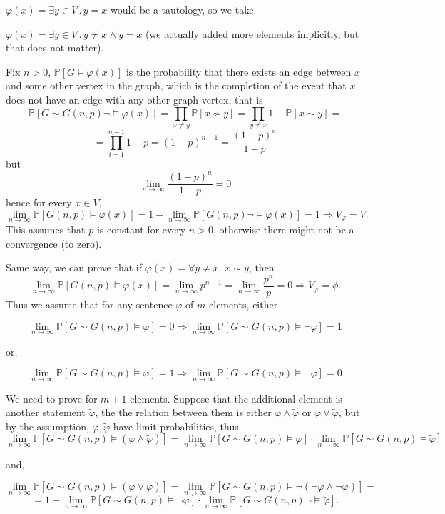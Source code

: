 \documentclass{article}
\begin{document}
$\varphi(x)=\exists{y\in{V}}\,.\,y={x}$ would be a tautology, so we take 

$\varphi(x)=\exists{y\in{V}}\,.\,y\neq{x}\land{y={x}}$ (we actually added more elements implicitly, but that does not matter).

Fix $n>0$, $\mathbb{P}[G\vDash\varphi(x)]$ is the probability that there exists an edge between $x$ and some other vertex in the graph, which is the completion of the event that $x$ does not have an edge with any other graph vertex, that is \[\mathbb{P}[G\sim{G(n,p)}\neg\vDash\varphi(x)]=\prod_{x\neq{y}}\mathbb{P}[x\nsim{y}]=\prod_{y\neq{x}}1-\mathbb{P}[x\sim{y}]=\]\[=\prod_{i=1}^{n-1}1-p=(1-p)^{n-1}=\frac{(1-p)^n}{1-p}\]
but \[\lim_{n\rightarrow\infty}\frac{(1-p)^n}{1-p}=0\]
hence for every $x\in{V}$, \[\lim_{n\rightarrow\infty}\mathbb{P}[G(n,p)\vDash\varphi(x)]=1-\lim_{n\rightarrow\infty}\mathbb{P}[G(n,p)\neg\vDash\varphi(x)]=1\Rightarrow{V_\varphi={V}}.\]
This assumes that $p$ is constant for every $n>0$, otherwise there might not be a convergence (to zero).

Same way, we can prove that if $\varphi(x)=\forall{y\neq{x}}\,.\,x\sim{y}$, then \[\lim_{n\rightarrow\infty}\mathbb{P}[G(n,p)\vDash\varphi(x)]=\lim_{n\rightarrow\infty}p^{n-1}=\lim_{n\rightarrow\infty}\frac{p^n}{p}=0\Rightarrow{V_\varphi=\phi}.\]
Thus we assume that for any sentence $\varphi$ of $m$ elements, either

\[\lim_{n\rightarrow\infty}\mathbb{P}[G\sim{G(n,p)\vDash\varphi}]=0\Rightarrow\lim_{n\rightarrow\infty}\mathbb{P}[G\sim{G(n,p)\vDash\neg\varphi}]=1\]

or,

\[\lim_{n\rightarrow\infty}\mathbb{P}[G\sim{G(n,p)\vDash\varphi}]=1\Rightarrow\lim_{n\rightarrow\infty}\mathbb{P}[G\sim{G(n,p)\vDash\neg\varphi}]=0\]

We need to prove for $m+1$ elements. Suppose that the additional element is another statement $\tilde\varphi$, the the relation between them is either $\varphi\land\tilde\varphi$ or $\varphi\lor\tilde\varphi$, but by the assumption, $\varphi,\tilde\varphi$ have limit probabilities, thus \[\lim_{n\rightarrow\infty
}\mathbb{P}[G\sim{G(n,p)}\vDash(\varphi\land\tilde\varphi)]=\lim_{n\rightarrow\infty
}\mathbb{P}[G\sim{G(n,p)}\vDash\varphi]\cdot\lim_{n\rightarrow\infty
}\mathbb{P}[G\sim{G(n,p)}\vDash\tilde\varphi]\]

and,

\[\lim_{n\rightarrow\infty
}\mathbb{P}[G\sim{G(n,p)}\vDash(\varphi\lor\tilde\varphi)]=\lim_{n\rightarrow\infty
}\mathbb{P}[G\sim{G(n,p)}\vDash\neg(\neg\varphi\land\neg\tilde\varphi)]=\]\[=1-\lim_{n\rightarrow\infty
}\mathbb{P}[G\sim{G(n,p)}\vDash\neg\varphi]\cdot\lim_{n\rightarrow\infty
}\mathbb{P}[G\sim{G(n,p)}\neg\vDash\tilde\varphi].\]
\end{document}

